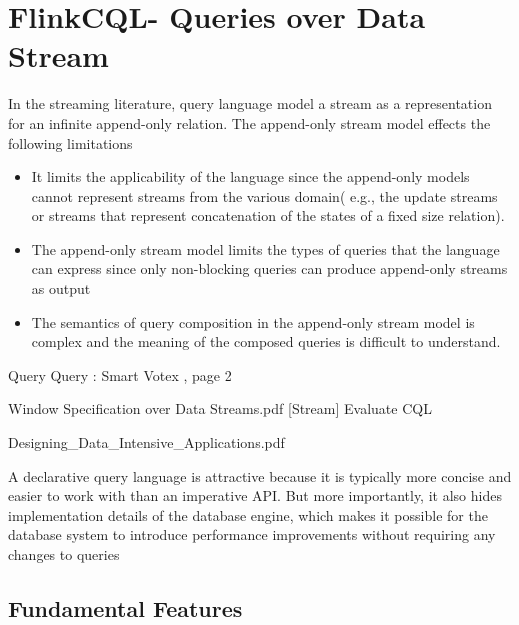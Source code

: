 
\chapter{FlinkCQL- Queries over Data Stream}

\ifpdf
    \graphicspath{{Chapter4/Figs/Raster/}{Chapter4/Figs/PDF/}{Chapter4/Figs/}}
\else
    \graphicspath{{Chapter4/Figs/Vector/}{Chapter4/Figs/}}
\fi

In the streaming literature, query language model a stream as a representation for an infinite append-only relation. The append-only stream model effects the following limitations\citep{Ghanem:2008}
\begin{itemize}
\item It limits the applicability of the language since the append-only models cannot represent streams from the various domain( e.g., the update streams or streams that represent concatenation of the states of a fixed size relation).
\item The append-only stream model limits the types of queries that the language can express since only non-blocking queries can produce append-only streams as output
\item The semantics of query composition in the append-only stream model is complex and the meaning of the composed queries is difficult to understand.
\end{itemize}

Query \citep{Babcock:2002} 
Query : Smart Votex , page 2

Window Specification over Data Streams.pdf
[Stream] Evaluate CQL

Designing\_Data\_Intensive\_Applications.pdf

A declarative query language is attractive because it is typically more concise and easier to work with than an imperative API. But more importantly, it also hides implementation details of the database engine, which makes it possible for the database system to introduce performance improvements without requiring any changes to queries




\section{Fundamental Features}

